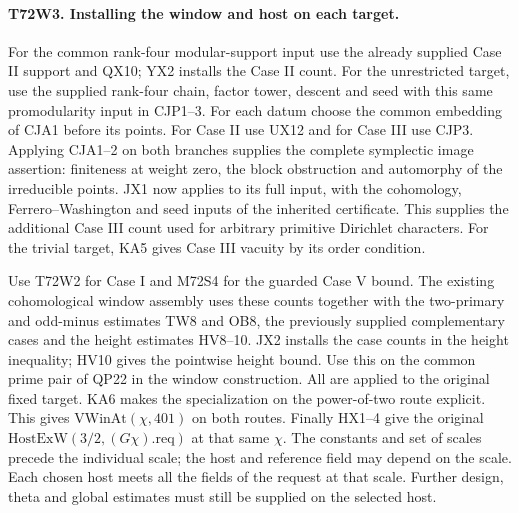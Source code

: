 \paragraph{T72W3. Installing the window and host on each target.}
For the common rank-four modular-support input use the already
supplied Case II support and QX10; YX2 installs the Case II count.
For the unrestricted target, use the supplied rank-four chain,
factor tower, descent and seed with this same promodularity input
in CJP1--3. For each datum choose the common embedding of
CJA1 before its points. For Case II use UX12 and for Case III use
CJP3. Applying CJA1--2 on both branches supplies the complete
symplectic image assertion: finiteness at weight zero, the block
obstruction and automorphy of the irreducible points. JX1 now applies
to its full input, with the cohomology, Ferrero--Washington and seed
inputs of the inherited certificate. This supplies the additional Case III count
used for arbitrary primitive Dirichlet characters. For the trivial
target, KA5 gives Case III vacuity by its order condition.

Use T72W2 for Case I and M72S4 for the guarded Case V bound.
The existing cohomological window assembly uses these counts
together with the two-primary and odd-minus estimates TW8 and
OB8, the previously supplied complementary cases and the
height estimates HV8--10. JX2 installs the case counts in
the height inequality; HV10 gives the pointwise height bound.
Use this on the common prime pair of QP22 in the window
construction. All are applied to the original fixed target. KA6 makes the specialization on the power-of-two
route explicit. This gives $\mathrm{VWinAt}(\chi,401)$ on
both routes. Finally HX1--4 give the original
$\mathrm{HostExW}(3/2,(G\chi).\mathrm{req})$ at that same $\chi$.
The constants and set of scales precede the individual scale;
the host and reference field may depend on the scale. Each chosen
host meets all the fields of the request at that scale. Further design, theta and global estimates must
still be supplied on the selected host.
